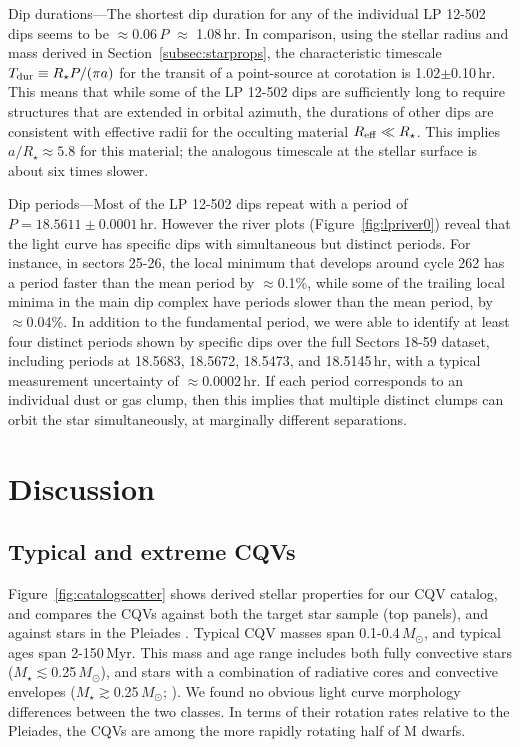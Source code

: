 \documentclass[11pt,twocolumn,tighten]{aastex63}
\begin{document}
{\sc Dip durations}---The shortest dip duration for any of the
individual LP 12-502 dips seems to be $\approx$0.06\,$P$ $\approx$
1.08\,hr.  In comparison, using the stellar radius and mass derived in
Section~\ref{subsec:starprops}, the characteristic timescale $T_{\rm
dur} \equiv R_\star P / (\pi a)$ for the transit of a point-source at
corotation is 1.02$\pm$0.10\,hr.  This means that while some of the LP
12-502 dips are sufficiently long to require structures that are
extended in orbital azimuth, the durations of other dips are
consistent with effective radii for the occulting material $R_{\rm
eff} \ll R_\star$.  This implies $a/R_\star \approx 5.8$ for this
material; the analogous timescale at the stellar surface is about six
times slower.

{\sc Dip periods}---Most of the LP 12-502 dips repeat with a period of
$P=18.5611 \pm 0.0001$\,hr.  However the river plots
(Figure~\ref{fig:lpriver0}) reveal that the light curve has specific
dips with simultaneous but distinct periods.  For instance, in sectors
25-26, the local minimum that develops around cycle 262 has a period
faster than the mean period by $\approx$0.1\%, while some of the
trailing local minima in the main dip complex have periods slower than
the mean period, by $\approx$0.04\%.  In addition to the fundamental
period, we were able to identify at least four distinct periods shown
by specific dips over the full Sectors 18-59 dataset, including
periods at 18.5683, 18.5672, 18.5473, and 18.5145\,hr, with a typical
measurement uncertainty of $\approx$0.0002\,hr.  If each period
corresponds to an individual dust or gas clump, then this implies that
multiple distinct clumps can orbit the star simultaneously, at
marginally different separations.



\section{Discussion}
\label{sec:discussion}


\subsection{Typical and extreme CQVs}
\label{subsec:extreme}

Figure~\ref{fig:catalogscatter} shows derived stellar properties for
our CQV catalog, and compares the CQVs against both the target star
sample (top panels), and against stars in the Pleiades
\citep{2016AJ....152..114R}.  Typical CQV masses span
0.1-0.4\,$M_\odot$, and typical ages span 2-150\,Myr.  This mass and
age range includes both fully convective stars
($M_\star$$\lesssim$0.25\,$M_\odot$), and stars with a combination of
radiative cores and convective envelopes
($M_\star$$\gtrsim$0.25\,$M_\odot$; \citealt{2018A&A...619A.177B}).
We found no obvious light curve morphology differences between the two
classes.  In terms of their rotation rates relative to the Pleiades,
the CQVs are among the more rapidly rotating half of M dwarfs. 
\end{document}
